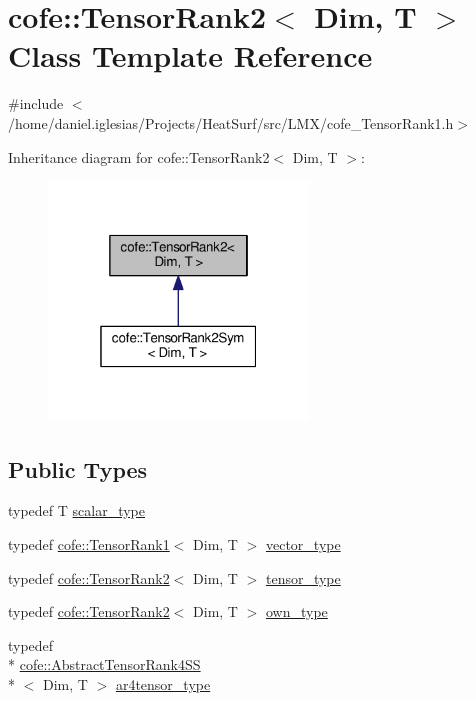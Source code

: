 \hypertarget{classcofe_1_1TensorRank2}{\section{cofe\-:\-:Tensor\-Rank2$<$ Dim, T $>$ Class Template Reference}
\label{classcofe_1_1TensorRank2}
}


{\ttfamily \#include $<$/home/daniel.\-iglesias/\-Projects/\-Heat\-Surf/src/\-L\-M\-X/cofe\-\_\-\-Tensor\-Rank1.\-h$>$}



Inheritance diagram for cofe\-:\-:Tensor\-Rank2$<$ Dim, T $>$\-:
\nopagebreak
\begin{figure}[H]
\begin{center}
\leavevmode
\includegraphics[width=196pt]{classcofe_1_1TensorRank2__inherit__graph}
\end{center}
\end{figure}
\subsection*{Public Types}
\begin{DoxyCompactItemize}
\item 
typedef T \hyperlink{classcofe_1_1TensorRank2_a3dce726b0c34912c6549a5911f478eaf}{scalar\-\_\-type}
\item 
typedef \hyperlink{classcofe_1_1TensorRank1}{cofe\-::\-Tensor\-Rank1}$<$ Dim, T $>$ \hyperlink{classcofe_1_1TensorRank2_a5c3ced2bb8f6574ba2ce2e1dab9d2c0b}{vector\-\_\-type}
\item 
typedef \hyperlink{classcofe_1_1TensorRank2}{cofe\-::\-Tensor\-Rank2}$<$ Dim, T $>$ \hyperlink{classcofe_1_1TensorRank2_a3af9468088af4836c93808edaceb03b0}{tensor\-\_\-type}
\item 
typedef \hyperlink{classcofe_1_1TensorRank2}{cofe\-::\-Tensor\-Rank2}$<$ Dim, T $>$ \hyperlink{classcofe_1_1TensorRank2_afef4f2c69f8a804d795c334bc382dc5f}{own\-\_\-type}
\item 
typedef \\*
\hyperlink{classcofe_1_1AbstractTensorRank4SS}{cofe\-::\-Abstract\-Tensor\-Rank4\-S\-S}\\*
$<$ Dim, T $>$ \hyperlink{classcofe_1_1TensorRank2_ae3f28ba9fd3ccd7afe9c5976b6e5178b}{ar4tensor\-\_\-type}
\end{DoxyCompactItemize}
